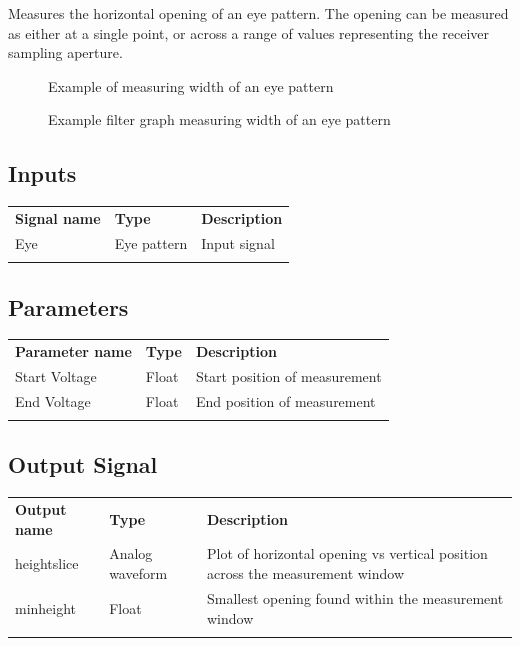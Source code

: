 Measures the horizontal opening of an eye pattern. The opening can be measured as either at a single point, or across a
range of values representing the receiver sampling aperture.

\begin{figure}[h]
\centering
{}
\caption{Example of measuring width of an eye pattern}
\label{filter_eye_width}
\end{figure}

\begin{figure}[h]
\centering
{}
\caption{Example filter graph measuring width of an eye pattern}
\label{filter_graph_eye_width}
\end{figure}
\FloatBarrier

\subsection{Inputs}

\begin{tabularx}{16cm}{llX}
\thickhline
\textbf{Signal name} & \textbf{Type} & \textbf{Description} \\
\thickhline
Eye & Eye pattern & Input signal\\
\thickhline
\end{tabularx}

\subsection{Parameters}

\begin{tabularx}{16cm}{llX}
\thickhline
\textbf{Parameter name} & \textbf{Type} & \textbf{Description} \\
\thickhline
Start Voltage & Float & Start position of measurement\\
\thinhline
End Voltage & Float & End position of measurement\\
\thickhline
\end{tabularx}

\subsection{Output Signal}

\begin{tabularx}{16cm}{llX}
\thickhline
\textbf{Output name} & \textbf{Type} & \textbf{Description} \\
\thickhline
heightslice & Analog waveform & Plot of horizontal opening vs vertical position across the measurement window \\
\thinhline
minheight & Float & Smallest opening found within the measurement window\\
\thickhline
\end{tabularx}

